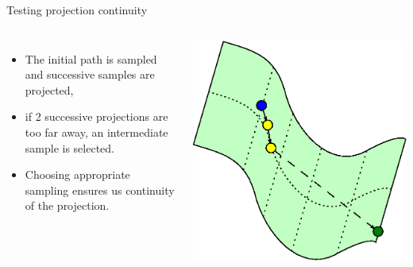 \begin {frame} {Testing projection continuity}
  \begin{columns}
    \centering
    \begin {itemize}
      \item The initial path is sampled and successive samples are projected,
      \item {\color {white} if 2 successive projections are too far away, an intermediate sample is selected.}
      \item {\color {white} Choosing appropriate sampling ensures us continuity of the projection.}
    \end {itemize}
    \begin {center}
      \includegraphics [width=.9\linewidth] {figures/progressive_2.eps}
    \end {center}
  \end {columns}
\end {frame}

%
%

